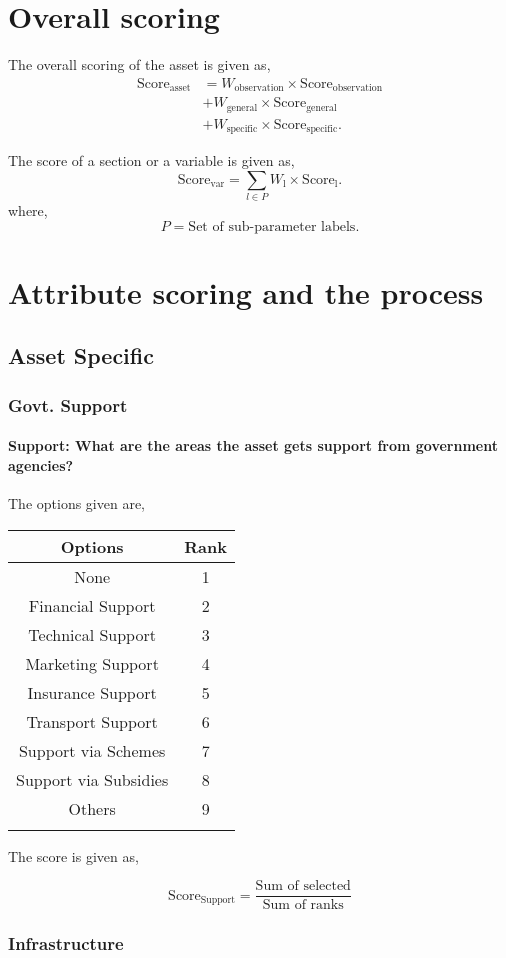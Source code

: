 \documentclass[oneside,twocolumn]{article}
\newcommand{\tsub}[2]{\text{#1}_{\text{#2}}}
\newcommand{\tsubb}[2]{#1_{\text{#2}}}
\newcommand{\dsub}[2]{\dfrac{\text{#1}}{\text{#2}}}
\newcommand{\multsel}[1]
{
	\[
		\tsub{Score}{#1} = \dsub{Sum of selected}{Sum of ranks}
	\]
}
\newenvironment{ttable}
{
\begin{center}
\begin{tabular}{c|c}
\hline
}
{
\\ \hline
\end{tabular}
\end{center}
}
\begin{document}
\section{Overall scoring}
The overall scoring of the asset is given as,
\begin{align*}
	\tsub{Score}{asset} &= \tsubb{W}{observation} \times \tsub{Score}{observation} \\
	&+ \tsubb{W}{general} \times \tsub{Score}{general} \\
	&+ \tsubb{W}{specific} \times \tsub{Score}{specific}.
\end{align*}

The score of a section or a variable is given as,
\[
	\tsub{Score}{var} = \sum_{l \in P} \tsubb{W}{l} \times \tsub{Score}{l}.
\]
where,
\[
	P = \text{Set of sub-parameter labels.}
\]
\section{Attribute scoring and the
process}
\subsection{Asset Specific}
\subsubsection{Govt. Support}

\paragraph{Support: What are the areas the asset gets support from government agencies?}

The options given are,
\begin{ttable}
Options & Rank \\ \hline
None & 1 \\
Financial Support & 2 \\
Technical Support & 3 \\
Marketing Support & 4 \\
Insurance Support & 5 \\
Transport Support & 6 \\
Support via Schemes & 7 \\
Support via Subsidies & 8 \\
Others & 9 \\
\hline
\end{ttable}
The score is given as,
\multsel{Support}
\subsubsection{Infrastructure}
\end{document}
